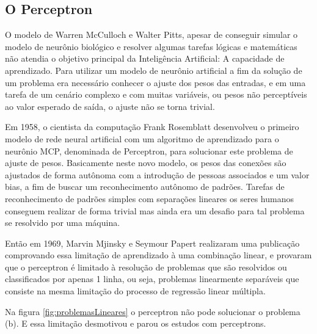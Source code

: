 \subsection{O Perceptron}

O modelo de Warren McCulloch e Walter Pitts, apesar de conseguir simular o modelo de neurônio biológico e resolver algumas tarefas lógicas e matemáticas não atendia o objetivo principal da Inteligência Artificial: A capacidade de aprendizado.
Para utilizar um modelo de neurônio artificial a fim da solução de um problema era necessário conhecer o ajuste dos pesos das entradas, e em uma tarefa de um cenário complexo e com muitas variáveis, ou pesos não perceptíveis ao valor esperado de saída, o ajuste não se torna trivial.
            
Em 1958, o cientista da computação Frank Rosemblatt desenvolveu o primeiro modelo de rede neural artificial com um algoritmo de aprendizado para o neurônio MCP, denominada de Perceptron, para solucionar este problema de ajuste de pesos.
Basicamente neste novo modelo, os pesos das conexões são ajustados de forma autônoma com a introdução de pessoas associados e um valor bias, a fim de buscar um reconhecimento autônomo de padrões. Tarefas de reconhecimento de padrões simples com separações lineares os seres humanos conseguem realizar de forma trivial mas ainda era um desafio para tal problema se resolvido por uma máquina.
            
Então em 1969, Marvin Mjinsky e Seymour Papert realizaram uma publicação comprovando essa limitação de aprendizado à uma combinação linear, e provaram que o perceptron é limitado à resolução de problemas que são resolvidos ou classificados por apenas 1 linha, ou seja, problemas linearmente separáveis que consiste na mesma limitação do processo de regressão linear múltipla.
            
            Na figura \ref{fig:problemasLineares} o perceptron não pode solucionar o problema (b). E essa limitação desmotivou e parou os estudos com perceptrons.
    		  \begin{figure}[H]
    		  	
    		  \end{figure}
	  	
